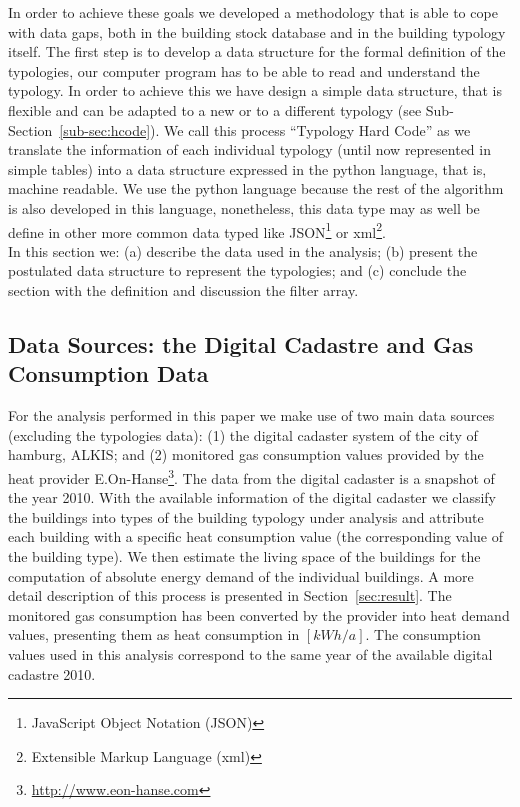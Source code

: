 \documentclass[authoryear,preprint,review,12pt]{elsarticle}
\begin{document}
\begin{linenumbers}
In order to achieve these goals we developed a methodology that is able to
cope with data gaps, both in the building stock database and in the
building typology itself.
%
%
%
The first step is to develop a data structure for the formal definition of the
typologies, our computer program has to be able to read and understand the
typology.  In order to achieve this we have design a simple data structure,
that is flexible and can be adapted to a new or to a different typology (see
Sub-Section~\ref{sub-sec:hcode}).  We call this process ``Typology Hard Code''
as we translate the information of each individual typology (until now
represented in simple tables) into a data structure expressed in the python
language, that is, machine readable.  We use the python language because the
rest of the algorithm is also developed in this language, nonetheless, this
data type may as well be define in other more common data typed like
JSON\footnote{JavaScript Object Notation (JSON)} or xml\footnote{Extensible
Markup Language (xml)}.\\

In this section we: (a) describe the data used in the analysis; (b) present the
postulated data structure to represent the typologies; and (c) conclude the
section with the definition and discussion the filter array.\\

\subsection{Data Sources: the Digital Cadastre and Gas Consumption
Data}\label{sub-sec:data}

For the analysis performed in this paper we make use of two main data sources
(excluding the typologies data): (1) the digital cadaster system of the city of
hamburg, ALKIS; and (2) monitored gas consumption values provided by the heat
provider E.On-Hanse\footnote{\url{http://www.eon-hanse.com}}. The data from
the digital cadaster is a snapshot of the year 2010.  With the available
information of the digital cadaster we classify the buildings into types of the
building typology under analysis and attribute each building with a specific
heat consumption value (the corresponding value of the building type).  We then
estimate the living space of the buildings for the computation of absolute
energy demand of the individual buildings. A more detail description of this
process is presented in Section~\ref{sec:result}. The monitored gas
consumption has been converted by the provider into heat demand values,
presenting them as heat consumption in $[kWh/a]$. The consumption values used
in this analysis correspond to the same year of the available digital cadastre
2010.\\


\end{linenumbers}
\end{document}
